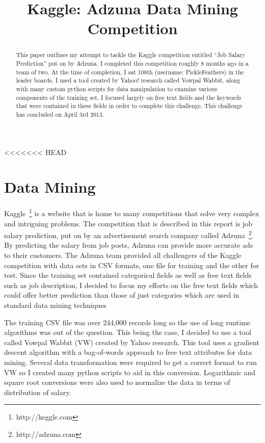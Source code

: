 \documentclass[conference]{IEEEtran}
\begin{document}
\title{Kaggle: Adzuna Data Mining Competition}

\author{
}

\maketitle


\begin{abstract}
This paper outlines my attempt to tackle the Kaggle competition entitled ``Job Salary Prediction''
put on by Adzuna. I completed this competition roughly 8 months ago in a team of two. At the time
of completion, I sat 108th (username: PickleFeathers) in the leader boards. I used a tool created by Yahoo! research called Vowpal
Wabbit, along with many custom python scripts for data manipulation to examine various components
of the training set. I focused largely on free text fields and the keywords that were contained in 
these fields in order to complete this challenge. This challenge has concluded on April 3rd 2013.

\end{abstract}


<<<<<<< HEAD
\section{Data Mining}

Kaggle~\footnote{http://keggle.com} is a website that is home to many competitions that solve very complex and intriguing problems. 
The competition that is  described in this report is job salary prediction, put on by an advertisement search company called 
Adzuna~\footnote{http://adzuna.com}. By predicting the salary from job posts, Adzuna can provide more accurate ads to their customers. 
The Adzuna team provided all challengers of the Kaggle competition with data sets in CSV formats, one file for training and the other 
for test. Since the training set contained categorical fields as well as free text fields such as job description, I decided to focus 
my efforts on the free text fields which could offer better prediction than those of just categories which are used in standard data 
mining techniques

The training CSV file was over 244,000 records long so the use of long runtime algorithms was out of the question. This being the case,
I decided to use a tool called Vowpal Wabbit (VW) created by Yahoo research. This tool uses a gradient descent
algorithm with a bag-of-words approach to free text attributes for data mining. Several data transformation were required to get
a correct format to run VW so I created many python scripts to aid in this conversion. Logarithmic and square root conversions were
also used to normalize the data in terms of distribution of salary.
\end{document}
